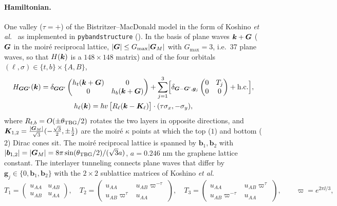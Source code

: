 \paragraph{Hamiltonian.} One valley ($\tau=+$) of the Bistritzer--MacDonald model in the form of
Koshino \emph{et al.}~\cite{BM2011,Koshino2018} as implemented in \texttt{pybandstructure}
(). In the basis of plane waves $\bm k+\bm G$ ($\bm G$ in the moir\'e reciprocal lattice,
$|\bm G|\le G_{\max}|\bm G_M|$ with $G_{\max}=3$, i.e.\ 37 plane waves, so that $H(\bm k)$ is a $148\times148$ matrix) and of the
four orbitals
$(\ell,\sigma)\in\{t,b\}\times\{A,B\}$,
\begin{gather}
H_{\bm G\bm G'}(\bm k)=\delta_{\bm G\bm G'}
\begin{pmatrix}h_t(\bm k+\bm G)&0\\0&h_b(\bm k+\bm G)\end{pmatrix}
+\sum_{j=1}^3\Bigl[\delta_{\bm G-\bm G',\bm g_j}\begin{pmatrix}0&T_j\\0&0\end{pmatrix}+{\rm h.c.}\Bigr],
\nonumber\\
h_\ell(\bm k)=\hbar v\,\bigl[R_\ell(\bm k-\bm K_\ell)\bigr]\cdot(\tau\sigma_x,-\sigma_y),
\end{gather}
where $R_{t,b}=O(\pm\theta_{\rm TBG}/2)$ rotates the two layers in opposite directions, and
$\bm K_{1,2}=\frac{|\bm G_M|}{\sqrt3}(-\frac{\sqrt3}{2},\pm\frac12)$ are the moir\'e $\kappa$ points at which the top ($1$) and bottom
($2$) Dirac cones sit. The moir\'e reciprocal lattice is spanned by $\bm b_1,\bm b_2$ with
$|\bm b_{1,2}|=|\bm G_M|=8\pi\sin(\theta_{\rm TBG}/2)/(\sqrt3a)$, $a=0.246$ nm the graphene lattice constant. The interlayer
tunneling connects plane waves that differ by $\bm g_j\in\{0,\bm b_1,\bm b_2\}$ with the $2\times2$ sublattice matrices of
Koshino \emph{et al.}~\cite{Koshino2018}
\begin{equation}
T_1=\begin{pmatrix}u_{AA}&u_{AB}\\u_{AB}&u_{AA}\end{pmatrix},\quad
T_2=\begin{pmatrix}u_{AA}&u_{AB}\varpi^{-\tau}\\u_{AB}\varpi^{\tau}&u_{AA}\end{pmatrix},\quad
T_3=\begin{pmatrix}u_{AA}&u_{AB}\varpi^{\tau}\\u_{AB}\varpi^{-\tau}&u_{AA}\end{pmatrix},\qquad\varpi=e^{2\pi\ii/3},
\end{equation}
